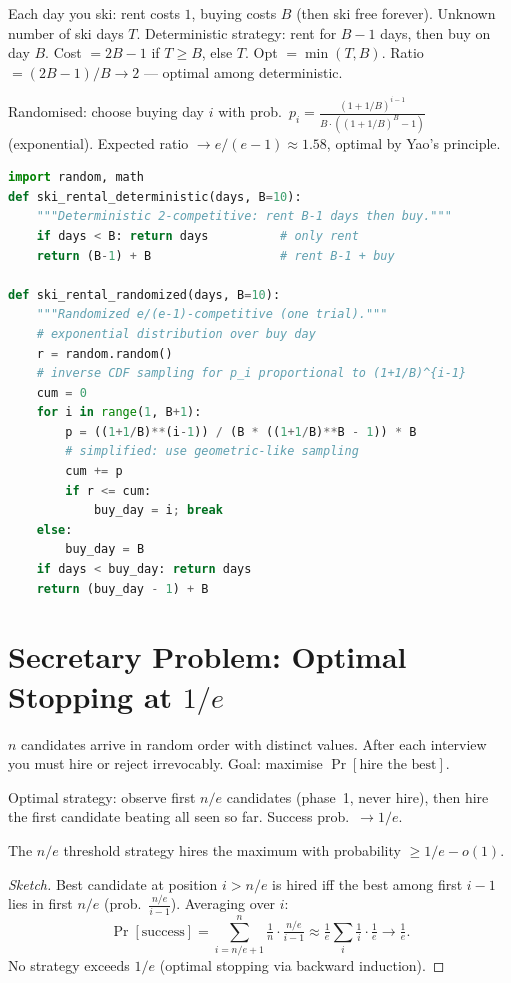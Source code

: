 Each day you ski: rent costs $1$, buying costs $B$ (then ski free forever). Unknown number of ski days $T$. Deterministic strategy: rent for $B-1$ days, then buy on day $B$. Cost $=2B-1$ if $T\ge B$, else $T$. Opt $=\min(T,B)$. Ratio $=(2B-1)/B\to2$ --- optimal among deterministic.

Randomised: choose buying day $i$ with prob.\ $p_i=\frac{(1+1/B)^{i-1}}{B\cdot((1+1/B)^B-1)}$ (exponential). Expected ratio $\to e/(e-1)\approx1.58$, optimal by Yao's principle.

\begin{lstlisting}[language=Python]
import random, math
def ski_rental_deterministic(days, B=10):
    """Deterministic 2-competitive: rent B-1 days then buy."""
    if days < B: return days          # only rent
    return (B-1) + B                  # rent B-1 + buy

def ski_rental_randomized(days, B=10):
    """Randomized e/(e-1)-competitive (one trial)."""
    # exponential distribution over buy day
    r = random.random()
    # inverse CDF sampling for p_i proportional to (1+1/B)^{i-1}
    cum = 0
    for i in range(1, B+1):
        p = ((1+1/B)**(i-1)) / (B * ((1+1/B)**B - 1)) * B
        # simplified: use geometric-like sampling
        cum += p
        if r <= cum:
            buy_day = i; break
    else:
        buy_day = B
    if days < buy_day: return days
    return (buy_day - 1) + B
\end{lstlisting}

\section{\texorpdfstring{Secretary Problem: Optimal Stopping at $1/e$}{Secretary Problem: Optimal Stopping at 1/e}}
\label{sec:secretary}

$n$ candidates arrive in random order with distinct values. After each interview you must hire or reject irrevocably. Goal: maximise $\Pr[\text{hire the best}]$.

Optimal strategy: observe first $n/e$ candidates (phase~1, never hire), then hire the first candidate beating all seen so far. Success prob.\ $\to1/e$.

\begin{theorem}[Secretary $1/e$]
The $n/e$ threshold strategy hires the maximum with probability $\ge1/e-o(1)$.
\end{theorem}
\begin{proof}[Sketch]
Best candidate at position $i>n/e$ is hired iff the best among first $i-1$ lies in first $n/e$ (prob.\ $\tfrac{n/e}{i-1}$). Averaging over $i$:
\[
\Pr[\text{success}]=\sum_{i=n/e+1}^{n}\tfrac1n\cdot\tfrac{n/e}{i-1}\approx\tfrac1e\sum_{i}\tfrac1{i}\cdot\tfrac1e\to\tfrac1e.
\]
No strategy exceeds $1/e$ (optimal stopping via backward induction).
\end{proof}

